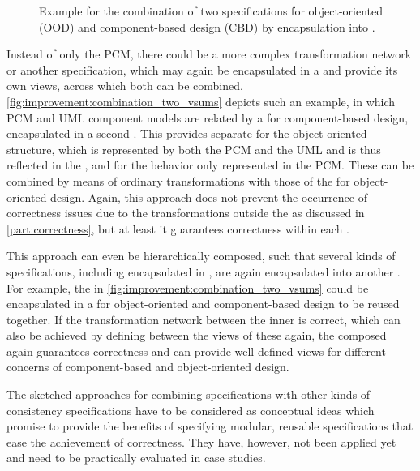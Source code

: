 \begin{figure}
    \centering
    
    \caption[Combination of two \commonalities specifications]{Example for the combination of two \commonalities specifications for object-oriented (OOD) and component-based design (CBD) by encapsulation into \vsumms.}
    \label{fig:improvement:combination_two_vsums}
\end{figure}

Instead of only the \gls{PCM}, there could be a more complex transformation network or another \commonalities specification, which may again be encapsulated in a \vsum and provide its own views, across which both \vsums can be combined.
\autoref{fig:improvement:combination_two_vsums} depicts such an example, in which \gls{PCM} and \gls{UML} component models are related by a \conceptmetamodel for component-based design, encapsulated in a second \vsum.
This \vsum provides separate \viewtypes for the object-oriented structure, which is represented by both the \gls{PCM} and the \gls{UML} and is thus reflected in the \conceptmetamodels, and for the behavior only represented in the \gls{PCM}.
These \viewtypes can be combined by means of ordinary transformations with those of the \vsum for object-oriented design.
Again, this approach does not prevent the occurrence of correctness issues due to the transformations outside the \vsum as discussed in \autoref{part:correctness}, but at least it guarantees correctness within each \vsum.

This approach can even be hierarchically composed, such that several kinds of specifications, including \commonalities encapsulated in \vsums, are again encapsulated into another \vsum.
For example, the \vsums in \autoref{fig:improvement:combination_two_vsums} could be encapsulated in a \vsum for object-oriented and component-based design to be reused together.
If the transformation network between the inner \vsums is correct, which can also be achieved by defining \commonalities between the views of these \vsums again, the composed \vsum again guarantees correctness and can provide well-defined views for different concerns of component-based and object-oriented design.

The sketched approaches for combining \commonalities specifications with other kinds of consistency specifications have to be considered as conceptual ideas which promise to provide the benefits of specifying modular, reusable specifications that ease the achievement of correctness.
They have, however, not been applied yet and need to be practically evaluated in case studies.

